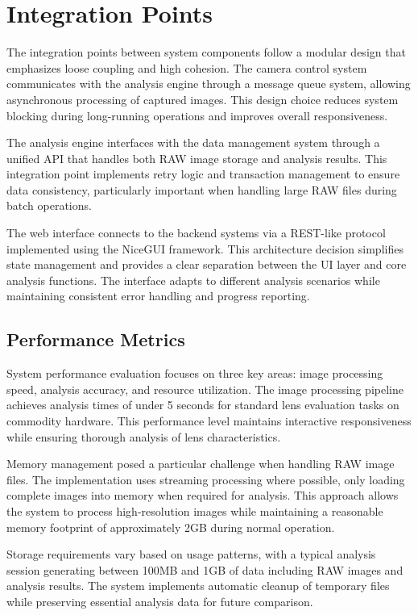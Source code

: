 \section{Integration Points} %
The integration points between system components follow a modular design that emphasizes loose coupling and high cohesion. The camera control system communicates with the analysis engine through a message queue system, allowing asynchronous processing of captured images. This design choice reduces system blocking during long-running operations and improves overall responsiveness.

The analysis engine interfaces with the data management system through a unified API that handles both RAW image storage and analysis results. This integration point implements retry logic and transaction management to ensure data consistency, particularly important when handling large RAW files during batch operations.

The web interface connects to the backend systems via a REST-like protocol implemented using the NiceGUI framework. This architecture decision simplifies state management and provides a clear separation between the UI layer and core analysis functions. The interface adapts to different analysis scenarios while maintaining consistent error handling and progress reporting.

\subsection{Performance Metrics}
System performance evaluation focuses on three key areas: image processing speed, analysis accuracy, and resource utilization. The image processing pipeline achieves analysis times of under 5 seconds for standard lens evaluation tasks on commodity hardware. This performance level maintains interactive responsiveness while ensuring thorough analysis of lens characteristics.

Memory management posed a particular challenge when handling RAW image files. The implementation uses streaming processing where possible, only loading complete images into memory when required for analysis. This approach allows the system to process high-resolution images while maintaining a reasonable memory footprint of approximately 2GB during normal operation.

Storage requirements vary based on usage patterns, with a typical analysis session generating between 100MB and 1GB of data including RAW images and analysis results. The system implements automatic cleanup of temporary files while preserving essential analysis data for future comparison.

